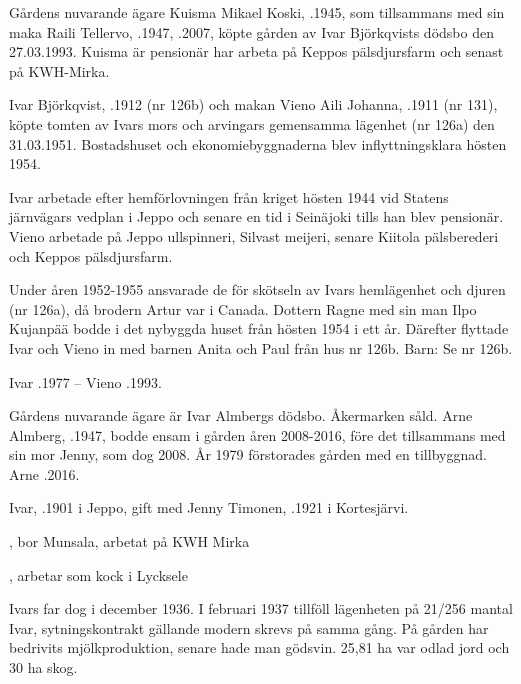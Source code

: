 
Gårdens nuvarande ägare Kuisma Mikael Koski, .1945, som tillsammans med sin maka Raili Tellervo, .1947, .2007, köpte gården av Ivar Björkqvists dödsbo den 27.03.1993. Kuisma är pensionär har arbeta på Keppos pälsdjursfarm och senast på KWH-Mirka.


Ivar Björkqvist, .1912 (nr 126b) och makan Vieno Aili Johanna, .1911 (nr 131), köpte tomten av Ivars mors och arvingars gemensamma lägenhet (nr 126a) den 31.03.1951. Bostadshuset och ekonomiebyggnaderna blev inflyttningsklara hösten 1954.

Ivar arbetade efter hemförlovningen från kriget hösten  1944 vid Statens järnvägars vedplan i Jeppo och senare en tid i Seinäjoki tills han blev pensionär. Vieno arbetade på Jeppo ullspinneri, Silvast meijeri, senare Kiitola pälsberederi och Keppos pälsdjursfarm.

Under åren 1952-1955 ansvarade de för skötseln av Ivars hemlägenhet och djuren (nr 126a), då brodern Artur var i Canada. Dottern Ragne med sin man Ilpo Kujanpää bodde i det nybyggda huset från hösten 1954 i ett år. Därefter flyttade Ivar och Vieno in med barnen Anita och Paul från hus nr 126b. Barn: Se nr 126b.

Ivar .1977  --  Vieno .1993.




Gårdens nuvarande ägare är Ivar Almbergs dödsbo. Åkermarken såld. Arne Almberg, .1947, bodde ensam i gården åren 2008-2016, före det tillsammans med sin mor Jenny, som dog 2008. År 1979 förstorades gården med en tillbyggnad. Arne .2016.


Ivar, .1901 i Jeppo, gift med Jenny Timonen, .1921 i Kortesjärvi.
\begin{jhchildren}
  \item {}, bor Munsala, arbetat på KWH Mirka
  \item {}
  \item {}
  \item {}, arbetar som kock i Lycksele
\end{jhchildren}
Ivars far dog i december 1936. I februari 1937 tillföll lägenheten på 21/256 mantal Ivar, sytningskontrakt gällande modern skrevs på samma gång. På gården har bedrivits mjölkproduktion, senare hade man gödsvin. 25,81 ha var odlad jord och 30 ha skog.

